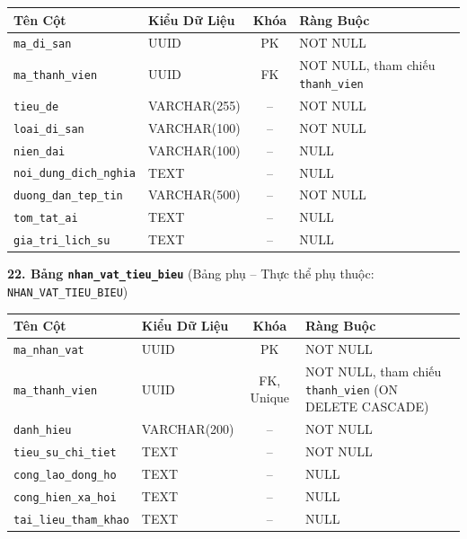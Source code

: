 \begin{center}
\small
\renewcommand{\arraystretch}{1.2}
\begin{tabular}{|p{3.8cm}|p{2.5cm}|c|p{6.5cm}|}
\hline
\textbf{Tên Cột} & \textbf{Kiểu Dữ Liệu} & \textbf{Khóa} & \textbf{Ràng Buộc} \\ \hline
\texttt{ma\_di\_san} & UUID & PK & NOT NULL \\ \hline
\texttt{ma\_thanh\_vien} & UUID & FK & NOT NULL, tham chiếu \texttt{thanh\_vien} \\ \hline
\texttt{tieu\_de} & VARCHAR(255) & -- & NOT NULL \\ \hline
\texttt{loai\_di\_san} & VARCHAR(100) & -- & NOT NULL \\ \hline
\texttt{nien\_dai} & VARCHAR(100) & -- & NULL \\ \hline
\texttt{noi\_dung\_dich\_nghia} & TEXT & -- & NULL \\ \hline
\texttt{duong\_dan\_tep\_tin} & VARCHAR(500) & -- & NOT NULL \\ \hline
\texttt{tom\_tat\_ai} & TEXT & -- & NULL \\ \hline
\texttt{gia\_tri\_lich\_su} & TEXT & -- & NULL \\ \hline
\end{tabular}
\end{center}
\vspace{0.3cm}

\noindent\textbf{22. Bảng \texttt{nhan\_vat\_tieu\_bieu}} \quad (Bảng phụ -- Thực thể phụ thuộc: \texttt{NHAN\_VAT\_TIEU\_BIEU})
\vspace{0.2cm}

\begin{center}
\small
\renewcommand{\arraystretch}{1.2}
\begin{tabular}{|p{3.8cm}|p{2.5cm}|c|p{6.5cm}|}
\hline
\textbf{Tên Cột} & \textbf{Kiểu Dữ Liệu} & \textbf{Khóa} & \textbf{Ràng Buộc} \\ \hline
\texttt{ma\_nhan\_vat} & UUID & PK & NOT NULL \\ \hline
\texttt{ma\_thanh\_vien} & UUID & FK, Unique & NOT NULL, tham chiếu \texttt{thanh\_vien} (ON DELETE CASCADE) \\ \hline
\texttt{danh\_hieu} & VARCHAR(200) & -- & NOT NULL \\ \hline
\texttt{tieu\_su\_chi\_tiet} & TEXT & -- & NOT NULL \\ \hline
\texttt{cong\_lao\_dong\_ho} & TEXT & -- & NULL \\ \hline
\texttt{cong\_hien\_xa\_hoi} & TEXT & -- & NULL \\ \hline
\texttt{tai\_lieu\_tham\_khao} & TEXT & -- & NULL \\ \hline
\end{tabular}
\end{center}
\vspace{0.3cm}

